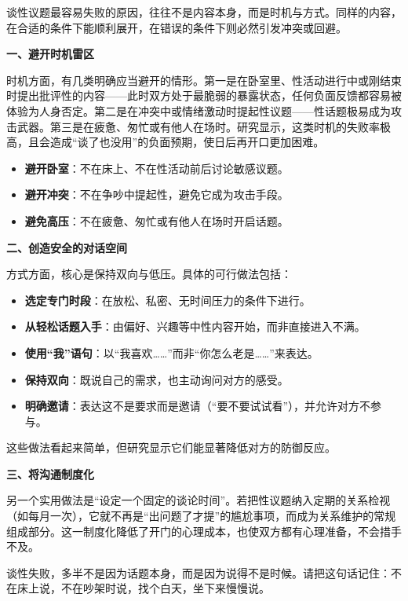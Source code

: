 \documentclass[12pt,UTF8]{ctexbook}
\begin{document}
谈性议题最容易失败的原因，往往不是内容本身，而是时机与方式。同样的内容，在合适的条件下能顺利展开，在错误的条件下则必然引发冲突或回避。

\textbf{一、避开时机雷区}

时机方面，有几类明确应当避开的情形。第一是在卧室里、性活动进行中或刚结束时提出批评性的内容——此时双方处于最脆弱的暴露状态，任何负面反馈都容易被体验为人身否定。第二是在冲突中或情绪激动时提起性议题——性话题极易成为攻击武器。第三是在疲惫、匆忙或有他人在场时。研究显示，这类时机的失败率极高，且会造成“谈了也没用”的负面预期，使日后再开口更加困难。

\begin{itemize}
\item \textbf{避开卧室}：不在床上、不在性活动前后讨论敏感议题。
\item \textbf{避开冲突}：不在争吵中提起性，避免它成为攻击手段。
\item \textbf{避免高压}：不在疲惫、匆忙或有他人在场时开启话题。
\end{itemize}

\textbf{二、创造安全的对话空间}

方式方面，核心是保持双向与低压。具体的可行做法包括：

\begin{itemize}
\item \textbf{选定专门时段}：在放松、私密、无时间压力的条件下进行。
\item \textbf{从轻松话题入手}：由偏好、兴趣等中性内容开始，而非直接进入不满。
\item \textbf{使用“我”语句}：以“我喜欢……”而非“你怎么老是……”来表达。
\item \textbf{保持双向}：既说自己的需求，也主动询问对方的感受。
\item \textbf{明确邀请}：表达这不是要求而是邀请（“要不要试试看”），并允许对方不参与。
\end{itemize}

这些做法看起来简单，但研究显示它们能显著降低对方的防御反应。

\textbf{三、将沟通制度化}

另一个实用做法是“设定一个固定的谈论时间”。若把性议题纳入定期的关系检视（如每月一次），它就不再是“出问题了才提”的尴尬事项，而成为关系维护的常规组成部分。这一制度化降低了开门的心理成本，也使双方都有心理准备，不会措手不及。

\begin{tcolorbox}[colback=pink!5!white,colframe=red!50!black,title=贴心小叮咛]
谈性失败，多半不是因为话题本身，而是因为说得不是时候。请把这句话记住：不在床上说，不在吵架时说，找个白天，坐下来慢慢说。
\end{tcolorbox}
\end{document}
